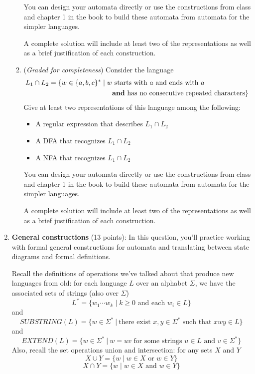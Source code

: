 \documentclass[12pt, oneside]{article}
\newcommand{\gradeComplete}{({\it Graded for completeness}) }
\begin{document}
\begin{enumerate}[wide, labelwidth=!, labelindent=0pt]
\begin{enumerate}
You can design your automata directly or use the constructions from class and chapter 1 in the book to build these automata from automata for the simpler languages.
    
A complete solution will include at least two of the representations
as well as  a brief justification of each construction.


\item\gradeComplete Consider the language
    \begin{align*}
    L_1 \cap L_2 = \{w \in \{a,b,c\}^* \mid w &\text{ starts with $a$ and ends with $a$} \\
    &\text{{\bf and} has no consecutive repeated characters}\}
    \end{align*}
    Give at least two representations of this language among the following: 
    \begin{itemize}
    \item A regular expression that describes $L_1 \cap L_2$
    \item A DFA that recognizes $L_1 \cap L_2$
    \item A NFA that recognizes $L_1 \cap L_2$
    \end{itemize}
    You can design your automata directly or use the constructions from class and chapter 1 in the book to build these automata from automata for the simpler languages.
    
A complete solution will include at least two of the representations
as well as  a brief justification of each construction.

\end{enumerate}

\item\textbf{General constructions} (13 points):
In this question, you'll practice working with formal general constructions
for automata and translating between state diagrams and formal definitions.


Recall the definitions of operations we've talked about that produce
new languages from old: for each language $L$ over an alphabet $\Sigma$, 
we have the 
associated sets of strings (also over $\Sigma$)
\[
    L^* = \{ w_1 \cdots w_k \mid k \geq 0 \textrm{ and each } w_i \in L\}
\]
and
\[
    SUBSTRING(L) = \{ w \in \Sigma^* ~|~ \text{there exist } x,y \in \Sigma^* \text{ such that } xwy \in L\}
\]
and 
\[
    EXTEND(L) = \{ w \in \Sigma^* ~|~ w = uv \text{ for some strings } u \in L \text{ and } v \in \Sigma^* \}
\]
Also, recall the set operations union and intersection: for any sets $X$ and $Y$
\[
X \cup Y = \{ w \mid w \in X \text{ or } w \in Y \}
\]
\[
X \cap Y = \{ w \mid w \in X \text{ and } w \in Y \}
\]



\end{enumerate}
\end{document}
